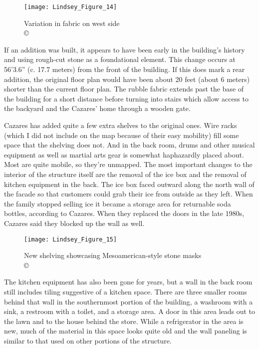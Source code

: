 \begin{figure}[!tb]
	\texttt{[image: Lindsey\_Figure\_14]}
	\caption{Variation in fabric on west side\\
		{\normalfont\scriptsize \copyright\
			\shortauthor
	}}
	\label{fig:Lindsey_Figure_14}
\end{figure}

If an addition was built, it appears to have been early in the building's history and using rough-cut stone as a foundational element. This change occurs at 56'3.6” (c. \num{17.7} meters) from the front of the building. If this does mark a rear addition, the original floor plan would have been about \num{20} feet (about \num{6} meters) shorter than the current floor plan. The rubble fabric extends past the base of the building for a short distance before turning into stairs which allow access to the backyard and the Cazares’ home through a wooden gate.

Cazares has added quite a few extra shelves to the original ones. Wire racks (which I did not include on the map because of their easy mobility) fill some space that the shelving does not. And in the back room, drums and other musical equipment as well as martial arts gear is somewhat haphazardly placed about. Most are quite mobile, so they're unmapped. The most important changes to the interior of the structure itself are the removal of the ice box and the removal of kitchen equipment in the back. The ice box faced outward along the north wall of the facade so that customers could grab their ice from outside as they left. When the family stopped selling ice it became a storage area for returnable soda bottles, according to Cazares. When they replaced the doors in the late 1980s, Cazares said they blocked up the wall as well.

\begin{figure}[!tb]
	\texttt{[image: Lindsey\_Figure\_15]}
	\caption{New shelving showcasing Mesoamerican-style stone masks\\
		{\normalfont\scriptsize \copyright\
			\shortauthor
	}}
	\label{fig:Lindsey_Figure_15}
\end{figure}

The kitchen equipment has also been gone for years, but a wall in the back room still includes tiling suggestive of a kitchen space. There are three smaller rooms behind that wall in the southernmost portion of the building, a washroom with a sink, a restroom with a toilet, and a storage area. A door in this area leads out to the lawn and to the house behind the store. While a refrigerator in the area is new, much of the material in this space looks quite old and the wall paneling is similar to that used on other portions of the structure.

